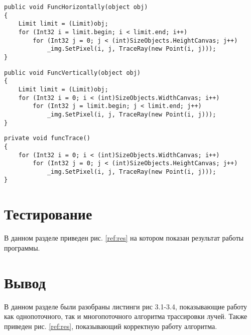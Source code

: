 \begin{lstlisting}[label=some-code,caption=Метод потока разбиения горизонтально]
public void FuncHorizontally(object obj)
{
	Limit limit = (Limit)obj;
	for (Int32 i = limit.begin; i < limit.end; i++)
		for (Int32 j = 0; j < (int)SizeObjects.HeightCanvas; j++)
			_img.SetPixel(i, j, TraceRay(new Point(i, j)));
}
\end{lstlisting}

\begin{lstlisting}[label=some-code,caption=Метод потока разбиения вертикально]
public void FuncVertically(object obj)
{
	Limit limit = (Limit)obj;
	for (Int32 i = 0; i < (int)SizeObjects.WidthCanvas; i++)
		for (Int32 j = limit.begin; j < limit.end; j++)
			_img.SetPixel(i, j, TraceRay(new Point(i, j)));
}
\end{lstlisting}

\begin{lstlisting}[label=some-code,caption=Однопоточный метод трассировки лучей.]
private void funcTrace()
{
	for (Int32 i = 0; i < (int)SizeObjects.WidthCanvas; i++)
		for (Int32 j = 0; j < (int)SizeObjects.HeightCanvas; j++)
			_img.SetPixel(i, j, TraceRay(new Point(i, j)));
}
\end{lstlisting}

\section{Тестирование}

В данном разделе приведен рис. \ref{ref:res} на котором показан результат работы программы.

\begin{figure}[ht!]
\end{figure}


\section{Вывод}

В данном разделе были разобраны листинги рис 3.1-3.4, показывающие работу как однопоточного, так и многопоточного
алгоритма трассировки лучей. Также приведен рис. \ref{ref:res}, показывающий корректную работу алгоритма.